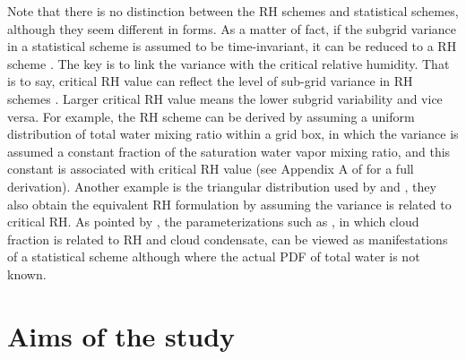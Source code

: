 Note that there is no distinction between the RH schemes and statistical schemes, although they seem different in forms. As a matter of fact, if the subgrid variance in a statistical scheme is assumed to be time-invariant, it can be reduced to a RH scheme \citep{Tompkins2002,Tompkins2005}. The key is to link the variance with the critical relative humidity. That is to say, critical RH value can reflect the level of sub-grid variance in RH schemes \citep{Quaas2012}. Larger critical RH value means the lower subgrid variability and vice versa. For example, the \cite{Sundqvist1978} RH scheme can be derived by assuming a uniform distribution of total water mixing ratio within a grid box, in which the variance is assumed a constant fraction of the saturation water vapor mixing ratio, and this constant is associated with critical RH value (see Appendix A of \cite{Quaas2012} for a full derivation). Another example is the triangular distribution used by \cite{Smith1990} and \cite{Park2014}, they also obtain the equivalent RH formulation by assuming the variance is related to critical RH. As pointed by \cite{Tompkins2002}, the parameterizations such as \cite{Xu1996}, in which cloud fraction is related to RH and cloud condensate, can be viewed as manifestations of a statistical scheme although where the actual PDF of total water is not known. %

\section{Aims of the study}
\label{sec:why_simple_cld_schem_in_isca}



